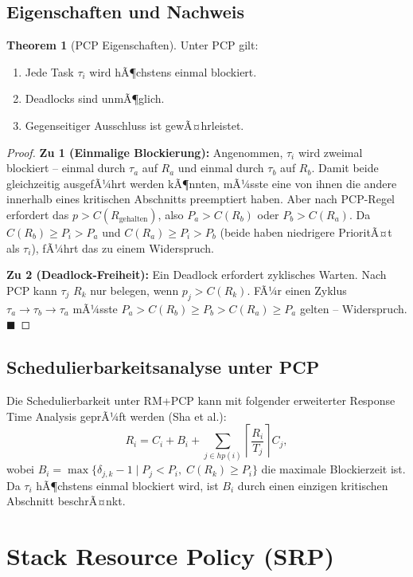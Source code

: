 ﻿\documentclass[a4paper,12pt]{report}
\theoremstyle{definition}
\newtheorem{theorem}{Theorem}[chapter]
\begin{document}
\subsection{Eigenschaften und Nachweis}

\begin{theorem}[PCP Eigenschaften]
	\label{thm:pcp}
	Unter PCP gilt:
	\begin{enumerate}
		\item Jede Task $\tau_i$ wird hÃ¶chstens einmal blockiert.
		\item Deadlocks sind unmÃ¶glich.
		\item Gegenseitiger Ausschluss ist gewÃ¤hrleistet.
	\end{enumerate}
\end{theorem}

\begin{proof}
	\textbf{Zu 1 (Einmalige Blockierung):} Angenommen, $\tau_i$ wird zweimal
	blockiert -- einmal durch $\tau_a$ auf $R_a$ und einmal durch $\tau_b$ auf $R_b$.
	Damit beide gleichzeitig ausgefÃ¼hrt werden kÃ¶nnten, mÃ¼sste eine von ihnen die
	andere innerhalb eines kritischen Abschnitts preemptiert haben. Aber nach PCP-Regel
	erfordert das $p > C(R_{\text{gehalten}})$, also $P_a > C(R_b)$ oder $P_b > C(R_a)$.
	Da $C(R_b) \geq P_i > P_a$ und $C(R_a) \geq P_i > P_b$ (beide haben niedrigere
	PrioritÃ¤t als $\tau_i$), fÃ¼hrt das zu einem Widerspruch.

	\textbf{Zu 2 (Deadlock-Freiheit):} Ein Deadlock erfordert zyklisches Warten.
	Nach PCP kann $\tau_j$ $R_k$ nur belegen, wenn $p_j > C(R_k)$. FÃ¼r einen Zyklus
	$\tau_a \to \tau_b \to \tau_a$ mÃ¼sste $P_a > C(R_b) \geq P_b > C(R_a) \geq P_a$
	gelten -- Widerspruch. \hfill$\blacksquare$
\end{proof}

\subsection{Schedulierbarkeitsanalyse unter PCP}

Die Schedulierbarkeit unter RM+PCP kann mit folgender erweiterter Response Time Analysis
geprÃ¼ft werden (Sha et al.):
\[
	R_i = C_i + B_i + \sum_{j \in hp(i)} \left\lceil \frac{R_i}{T_j} \right\rceil C_j,
\]
wobei $B_i = \max\{\delta_{j,k}-1 \mid P_j < P_i,\; C(R_k) \geq P_i\}$ die maximale
Blockierzeit ist. Da $\tau_i$ hÃ¶chstens einmal blockiert wird, ist $B_i$ durch einen
einzigen kritischen Abschnitt beschrÃ¤nkt.

\section{Stack Resource Policy (SRP)}
\end{document}
